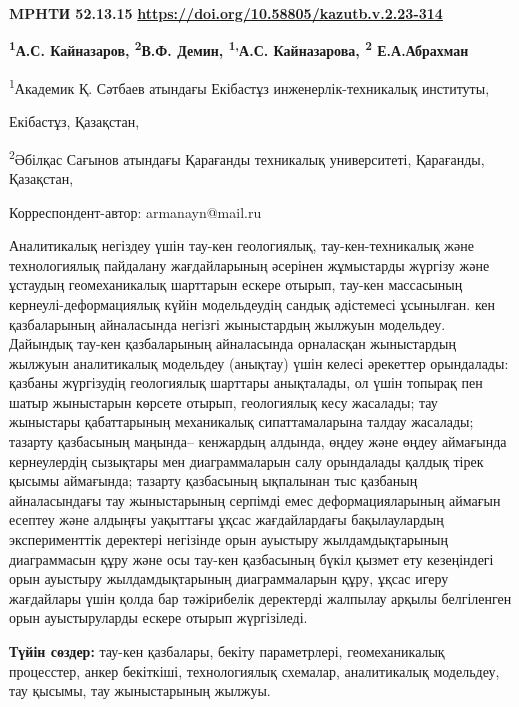 \newpage
{\bfseries MPHTИ 52.13.15}
\hfill {\bfseries \href{https://doi.org/10.58805/kazutb.v.2.23-314}{https://doi.org/10.58805/kazutb.v.2.23-314}}


\begin{center}
{\bfseries \textsuperscript{1}А.С. Кайназаров\envelope, \textsuperscript{2}В.Ф. Демин, \textsuperscript{1,}А.С. Кайназарова, \textsuperscript{2} Е.А.Абрахман}

\textsuperscript{1}Академик Қ. Сәтбаев атындағы Екібастұз
инженерлік-техникалық институты,

Екібастұз, Қазақстан,

\textsuperscript{2}Әбілқас Сағынов атындағы Қарағанды техникалық
университеті, Қарағанды, Қазақстан,

\envelope Корреспондент-автор: armanayn@mail.ru
\end{center}

Аналитикалық негіздеу үшін тау-кен геологиялық, тау-кен-техникалық және
технологиялық пайдалану жағдайларының әсерінен жұмыстарды жүргізу және
ұстаудың геомеханикалық шарттарын ескере отырып, тау-кен массасының
кернеулі-деформациялық күйін модельдеудің сандық әдістемесі ұсынылған.
кен қазбаларының айналасында негізгі жыныстардың жылжуын модельдеу.
Дайындық тау-кен қазбаларының айналасында орналасқан жыныстардың жылжуын
аналитикалық модельдеу (анықтау) үшін келесі әрекеттер орындалады:
қазбаны жүргізудің геологиялық шарттары анықталады, ол үшін топырақ пен
шатыр жыныстарын көрсете отырып, геологиялық кесу жасалады; тау
жыныстары қабаттарының механикалық сипаттамаларына талдау жасалады;
тазарту қазбасының маңында-- кенжардың алдында, өңдеу және өңдеу
аймағында кернеулердің сызықтары мен диаграммаларын салу орындалады
қалдық тірек қысымы аймағында; тазарту қазбасының ықпалынан тыс қазбаның
айналасындағы тау жыныстарының серпімді емес деформацияларының аймағын
есептеу және алдыңғы уақыттағы ұқсас жағдайлардағы бақылаулардың
эксперименттік деректері негізінде орын ауыстыру жылдамдықтарының
диаграммасын құру және осы тау-кен қазбасының бүкіл қызмет ету
кезеңіндегі орын ауыстыру жылдамдықтарының диаграммаларын құру, ұқсас
игеру жағдайлары үшін қолда бар тәжірибелік деректерді жалпылау арқылы
белгіленген орын ауыстыруларды ескере отырып жүргізіледі.

{\bfseries Түйін сөздер:} тау-кен қазбалары, бекіту параметрлері,
геомеханикалық процесстер, анкер бекіткіші, технологиялық схемалар,
аналитикалық модельдеу, тау қысымы, тау жыныстарының жылжуы.

